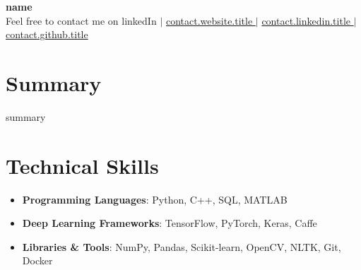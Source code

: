 \documentclass[a4paper,11pt]{article}
\makeatletter
\newcommand{\resumeItem}[1]{\item\small{#1}}
\newcommand{\resumeSubheading}[4]{
\vspace{-1pt}\item
  \begin{tabular*}{0.97\textwidth}[t]{l@{\extracolsep{\fill}}r}
    \textbf{#1} & #2 \\
    \textit{#3} & \textit{#4} \\
  \end{tabular*}\vspace{-7pt}
}
\newcommand{\resumeSubHeadingList}{\begin{itemize}[leftmargin=0.15in, label={}]}
\newcommand{\resumeSubHeadingListEnd}{\end{itemize}}
\makeatother
\begin{document}
\begin{center}
  \textbf{\Huge {{ name }}} \\
  \small Feel free to contact me on linkedIn $|$
  \href{ {{ contact.website.url }} }{ {{ contact.website.title }} } $|$
  \href{ {{ contact.linkedin.url }} }{ {{ contact.linkedin.title }} } $|$
  \href{ {{ contact.github.url }} }{ {{ contact.github.title }} }
\end{center}

\section*{Summary}
{{ summary }}

\section{Technical Skills}
\resumeSubHeadingList
  \resumeItem{\textbf{Programming Languages}: Python, C++, SQL, MATLAB}
  \resumeItem{\textbf{Deep Learning Frameworks}: TensorFlow, PyTorch, Keras, Caffe}
  \resumeItem{\textbf{Libraries \& Tools}: NumPy, Pandas, Scikit-learn, OpenCV, NLTK, Git, Docker}
\resumeSubHeadingListEnd

\end{document}
